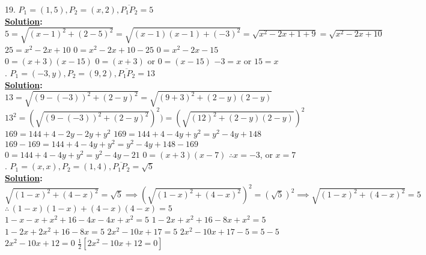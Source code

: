 \documentclass[10pt,letterpaper]{article}
\begin{document}
19. $P_{1} = (1, 5), P_{2} = (x, 2), \overline{P_1P_2} = 5$\\
\textbf{\underline {Solution}:}\\
\newline$5=\sqrt{(x-1)^2+(2-5)^2}=\sqrt{(x-1)(x-1)+(-3)^2}=\sqrt{x^2-2x+1+9}=\sqrt{x^2-2x+10}$
\newline$25=x^2-2x+10$
\newline$0=x^2-2x+10-25$
\newline$0=x^2-2x-15$
\newline$0=(x+3)(x-15)$
\newline$0=(x+3)$ or $0=(x-15)$
\newline$-3=x$ or $15=x$\\
. $P_{1} = (-3, y), P_{2} = (9, 2), \overline{P_1P_2 }= 13$\\
\textbf{\underline {Solution}:}\\
\newline$13=\sqrt{(9-(-3))^2+(2-y)^2} = \sqrt{(9+3)^2+(2-y)(2-y)}$
\newline$13^2=(\sqrt{(9-(-3))^2+(2-y)^2})^2) = (\sqrt{(12)^2+(2-y)(2-y)})^2$
\newline$169=144+4-2y-2y+y^2$
\newline$169=144+4-4y+y^2=y^2-4y+148$
\newline$169-169=144+4-4y+y^2=y^2-4y+148-169$
\newline$0=144+4-4y+y^2=y^2-4y-21$
\newline$0=(x+3)(x-7)$
\newline$\therefore x=-3$, or $x=7$\\
. $P_{1} = (x, x), P_{2} = (1, 4), \overline{P_1P_2} = \sqrt{5}$\\
\textbf{\underline {Solution}:}\\
\newline$\sqrt{(1-x)^2+(4-x)^2}=\sqrt{5} \implies (\sqrt{(1-x)^2+(4-x)^2})^2=(\sqrt{5})^2 \implies \sqrt{(1-x)^2+(4-x)^2}=5$
\newline$\therefore\,(1-x)(1-x)+(4-x)(4-x)=5$
\newline$1-x-x+x^2+16-4x-4x+x^2=5$
\newline$1-2x+x^2+16-8x+x^2=5$
\newline$1-2x+2x^2+16-8x=5$
\newline$2x^2-10x+17=5$
\newline$2x^2-10x+17-5=5-5$
\newline$2x^2-10x+12=0$
\newline$\frac{1}{2}[2x^2-10x+12=0]$
\end{document}
